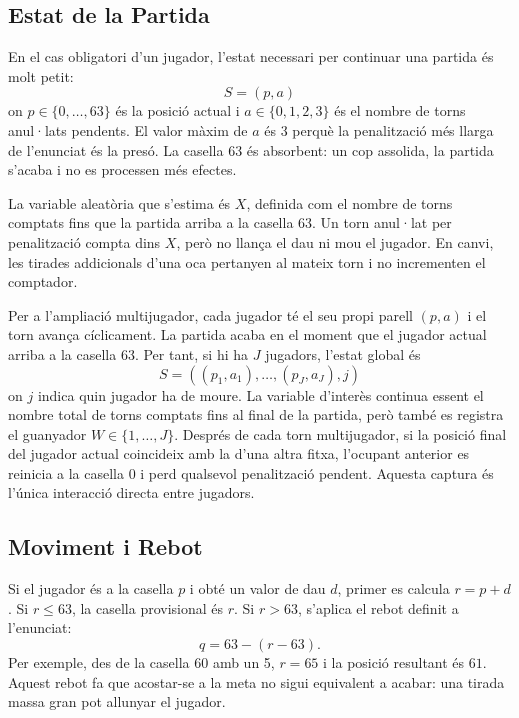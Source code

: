 \documentclass[conference,compsoc]{IEEEtran}
\begin{document}
\subsection{Estat de la Partida}

En el cas obligatori d'un jugador, l'estat necessari per continuar una partida és
molt petit:
\begin{equation}
S=(p,a)
\end{equation}
on $p\in\{0,\ldots,63\}$ és la posició actual i $a\in\{0,1,2,3\}$ és el nombre de
torns anul·lats pendents. El valor màxim de $a$ és 3 perquè la penalització més
llarga de l'enunciat és la presó. La casella 63 és absorbent: un cop assolida, la
partida s'acaba i no es processen més efectes.

La variable aleatòria que s'estima és $X$, definida com el nombre de torns
comptats fins que la partida arriba a la casella 63.
Un torn anul·lat per penalització compta dins $X$, però no llança el dau ni mou el
jugador. En canvi, les tirades addicionals d'una oca pertanyen al mateix torn i no
incrementen el comptador.

Per a l'ampliació multijugador, cada jugador té el seu propi parell $(p,a)$ i el
torn avança cíclicament. La partida acaba en el moment que el jugador actual arriba
a la casella 63. Per tant, si hi ha $J$ jugadors, l'estat global és
\begin{equation}
S=((p_1,a_1),\ldots,(p_J,a_J),j)
\end{equation}
on $j$ indica quin jugador ha de moure. La variable d'interès continua essent el
nombre total de torns comptats fins al final de la partida, però també es registra
el guanyador $W\in\{1,\ldots,J\}$. Després de cada torn multijugador, si la posició
final del jugador actual coincideix amb la d'una altra fitxa, l'ocupant anterior es
reinicia a la casella 0 i perd qualsevol penalització pendent. Aquesta captura és
l'única interacció directa entre jugadors.

\subsection{Moviment i Rebot}

Si el jugador és a la casella $p$ i obté un valor de dau $d$, primer es calcula
$r=p+d$. Si $r\leq63$, la casella provisional és $r$. Si $r>63$, s'aplica el rebot
definit a l'enunciat:
\begin{equation}
\label{eq:rebot}
q = 63 - (r-63).
\end{equation}
Per exemple, des de la casella 60 amb un 5, $r=65$ i la posició resultant és
$61$. Aquest rebot fa que acostar-se a la meta no sigui equivalent a acabar: una
tirada massa gran pot allunyar el jugador.
\end{document}
